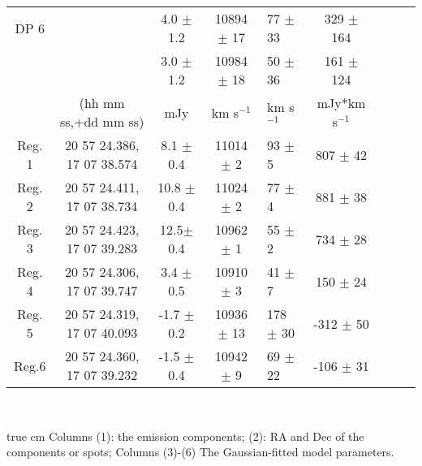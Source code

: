\documentclass[]{aa} %
\newcommand{\kms}{km s$^{-1}$\xspace}
\begin{document}
\begin{table*}
\begin{center}
\begin{tabular}{c c c c l c c c c}
   DP 6      &         & 4.0 $\pm$ 1.2         & 10894 $\pm$ 17   & 77 $\pm$ 33      & 329 $\pm$ 164     \\   %
             &         & 3.0 $\pm$ 1.2         & 10984 $\pm$ 18   & 50 $\pm$ 36      & 161 $\pm$ 124     \\   %
     \hline
            & (hh mm ss,+dd mm ss)        & mJy          & \kms                 & \kms               & mJy*\kms       \\

   Reg. 1    & 20 57 24.386, 17 07 38.574  &  8.1 $\pm$ 0.4    & 11014 $\pm$ 2      & 93 $\pm$ 5       & 807 $\pm$ 42    \\
   Reg. 2    & 20 57 24.411, 17 07 38.734  &  10.8 $\pm$ 0.4    & 11024 $\pm$ 2     & 77 $\pm$ 4       & 881 $\pm$ 38    \\
   Reg. 3    & 20 57 24.423, 17 07 39.283  &  12.5$\pm$ 0.4    & 10962 $\pm$ 1      & 55 $\pm$ 2       & 734 $\pm$ 28    \\
   Reg. 4    & 20 57 24.306, 17 07 39.747  &  3.4 $\pm$ 0.5    & 10910 $\pm$ 3      & 41 $\pm$ 7       & 150 $\pm$ 24    \\
   Reg. 5    & 20 57 24.319, 17 07 40.093  &  -1.7 $\pm$ 0.2    & 10936 $\pm$ 13     & 178 $\pm$ 30      & -312 $\pm$ 50    \\
   Reg.6    & 20 57 24.360, 17 07 39.232  &  -1.5 $\pm$ 0.4    & 10942 $\pm$ 9      & 69 $\pm$ 22      & -106 $\pm$ 31    \\


  \hline
  \end{tabular}\\

    \end{center}
     true cm \noindent Columns (1): the emission components; (2): RA and Dec of the components or spots; Columns (3)-(6) The Gaussian-fitted model parameters.
    \end{table*}
\end{document}
